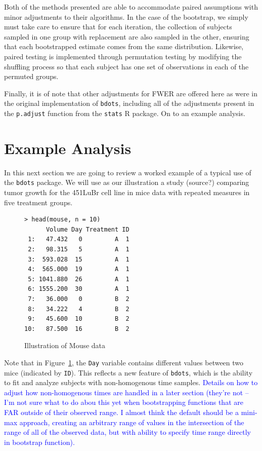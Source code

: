\documentclass{article}
\providecommand{\cn}[1]{\textcolor{blue}{#1}}
\newcommand{\xt}{\texttt}%
\begin{document}
Both of the methods presented are able to accommodate paired assumptions with minor adjustments to their algorithms. In the case of the bootstrap, we simply must take care to ensure that for each iteration, the collection of subjects sampled in one group with replacement are also sampled in the other, ensuring that each bootstrapped estimate comes from the same distribution. Likewise, paired testing is implemented through permutation testing by modifying the shuffling process so that each subject has one set of observations in each of the permuted groups.

Finally, it is of note that other adjustments for FWER are offered here as were in the original implementation of \xt{bdots}, including all of the adjustments present in the \xt{p.adjust} function from the \xt{stats} R package. On to an example analysis.


\section{Example Analysis}

In this next section we are going to review a worked example of a typical use of the \xt{bdots} package. We will use as our illustration a study (source?) comparing tumor growth for the 451LuBr cell line in mice data with repeated measures in five treatment groups.

\begin{singlespace}
\begin{figure}
\centering
\begin{BVerbatim}
> head(mouse, n = 10)
      Volume Day Treatment ID
 1:   47.432   0         A  1
 2:   98.315   5         A  1
 3:  593.028  15         A  1
 4:  565.000  19         A  1
 5: 1041.880  26         A  1
 6: 1555.200  30         A  1
 7:   36.000   0         B  2
 8:   34.222   4         B  2
 9:   45.600  10         B  2
10:   87.500  16         B  2
\end{BVerbatim}
\caption{Illustration of Mouse data}
\label{fig:mouse_head}
\end{figure}
\end{singlespace}

Note that in Figure~\ref{fig:mouse_head}, the \xt{Day} variable contains different values between two mice (indicated by \xt{ID}). This reflects a new feature of \xt{bdots}, which is the ability to fit and analyze subjects with non-homogenous time samples. \cn{Details on how to adjust how non-homogenous times are handled in a later section (they're not -- I'm not sure what to do abou this yet when bootstrapping functions that are FAR outside of their observed range. I almost think the default should be a mini-max approach, creating an arbitrary range of values in the intersection of the range of all of the observed data, but with ability to specify time range directly in bootstrap function).}
\end{document}
